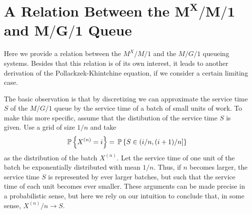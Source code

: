 \section
[A Relation Between the $M^X/M/1$ and $M/G/1$  Queue]
{A Relation Between the $\mathbf{M^X/M/1}$ and $\mathbf{M/G/1}$  Queue}
\label{sec:relat-batch-queu}


Here we provide a relation between the $M^X/M/1$ and the $M/G/1$
queueing systems. Besides that this relation is of its own interest,
it leads to another derivation of the Pollackzek-Khintchine equation,
if we consider a certain limiting case.

The basic observation is that by discretizing we can approximate the
service time $S$ of the $M/G/1$ queue by the service time of a batch
of small units of work. To make this more specific, assume that the
distibution of the service time $S$ is given. Use a grid of size $1/n$
and take
\begin{equation}\label{eq:69}
  \P{X^{(n)} = i} = \P{ S\in(i/n, (i+1)/n]}
\end{equation}
as the distribution of the batch $X^{(n)}$. Let the service time of
one unit of the batch be exponentially distributed with mean $1/n$.
Thus, if $n$ becomes larger, the service time $S$ is represented by
ever larger batches, but such that the service time of each unit
becomes ever smaller. These arguments can be made precise in a
probabilistic sense, but here we rely on our intuition to conclude
that, in some sense, $X^{(n)}/n \to S$. 

